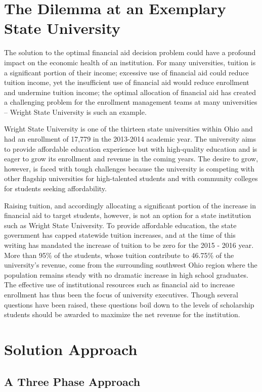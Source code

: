 \documentclass[12pt,english]{report}
\begin{document}
\section{The Dilemma at an Exemplary State University}
The solution to the optimal financial aid decision problem could have a
profound impact on the economic health of an institution.  For many
universities, tuition is a significant portion of their income; excessive use
of financial aid  could reduce tuition income, yet the insufficient use of
financial aid would reduce enrollment and undermine tuition income; the optimal
allocation of financial aid has created a challenging problem for the
enrollment management teams at many universities -- Wright State University is
such an example.

Wright State University is one of the thirteen state universities within Ohio
and had an enrollment of 17,779  in the 2013-2014 academic year. The university
aims to provide affordable education experience but with high-quality education
and is eager to grow its enrollment and revenue in the coming years.  
The desire to grow, however, is faced with tough challenges because the
university
is competing with other flagship universities for high-talented students and
with 
community colleges for students seeking affordability.

Raising tuition, and accordingly allocating a significant portion of the
increase in financial aid to target students, however, is not an option for a
state
institution such as Wright State University. To provide affordable education,
the state government has capped statewide tuition increases, and at the time of
this writing has mandated the increase of tuition to be zero for the 2015 -
2016 year. More than 95\% of the students, whose tuition contribute to 46.75\%
of the university's revenue, come from the surrounding southwest Ohio region
where the population remains steady with no dramatic increase in high school
graduates. The effective use of institutional resources such as financial aid
to increase enrollment has thus been the focus of university executives.
Though several questions have been raised, these questions boil down to the
levels of scholarship students should be awarded to maximize the net
revenue for the institution.


\section{Solution Approach}
\subsection{A Three Phase Approach}
\end{document}
